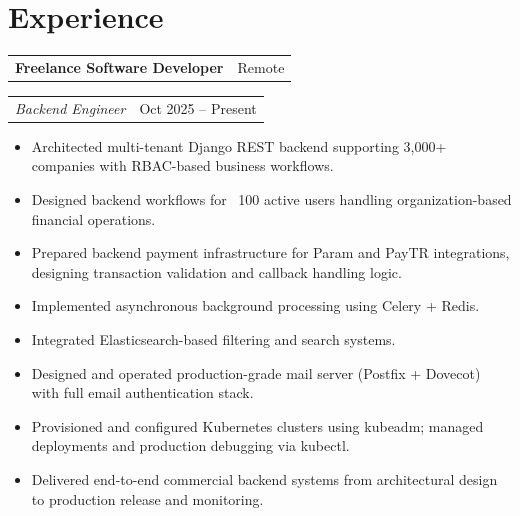 \documentclass[10pt,a4paper]{extarticle}
\makeatletter
\newcommand{\entry}[2]{%
\noindent\begin{tabular*}{\textwidth}{@{\extracolsep{\fill}}lr}
\textbf{#1} & #2\\
\end{tabular*}
}
\newcommand{\subentry}[2]{%
\noindent\begin{tabular*}{\textwidth}{@{\extracolsep{\fill}}lr}
\textit{#1} & #2\\
\end{tabular*}
}
\makeatother
\begin{document}
\section{Experience}

\entry{Freelance Software Developer}{Remote}
\subentry{Backend Engineer}{Oct 2025 -- Present}
\begin{itemize}[leftmargin=*,noitemsep,topsep=0pt]
\item Architected multi-tenant Django REST backend supporting 3,000+ companies with RBAC-based business workflows.
\item Designed backend workflows for ~100 active users handling organization-based financial operations.
\item Prepared backend payment infrastructure for Param and PayTR integrations, designing transaction validation and callback handling logic.
\item Implemented asynchronous background processing using Celery + Redis.
\item Integrated Elasticsearch-based filtering and search systems.
\item Designed and operated production-grade mail server (Postfix + Dovecot) with full email authentication stack.
\item Provisioned and configured Kubernetes clusters using kubeadm; managed deployments and production debugging via kubectl.
\item Delivered end-to-end commercial backend systems from architectural design to production release and monitoring.
\end{itemize}
\end{document}
